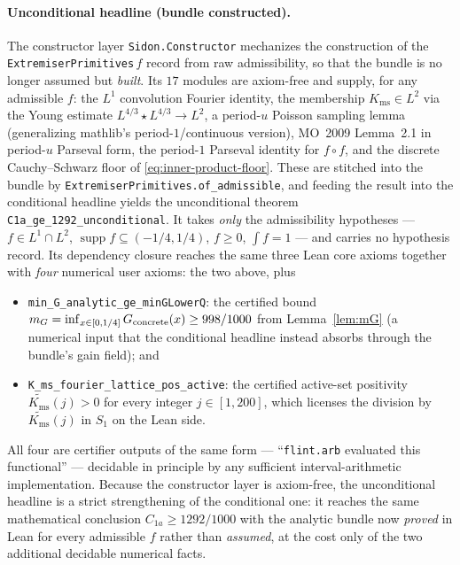 \documentclass[11pt, letterpaper]{article}
\theoremstyle{paperplain}
\theoremstyle{paperdef}
\newcommand{\supp}{\operatorname{supp}}
\newcommand{\Kms}{K_{\mathrm{ms}}}
\begin{document}
\paragraph{Unconditional headline (bundle constructed).}
The constructor layer \texttt{Sidon.Constructor} mechanizes the
construction of the \texttt{ExtremiserPrimitives}\,$f$ record from raw
admissibility, so that the bundle is no longer assumed but
\emph{built}.  Its $17$ modules are axiom-free and supply, for any
admissible $f$: the $L^1$ convolution Fourier identity, the
membership $\Kms\in L^2$ via the Young estimate
$L^{4/3}\!\star L^{4/3}\!\to L^2$, a period-$u$ Poisson sampling lemma
(generalizing mathlib's period-$1$/continuous version), MO~2009
Lemma~2.1 in period-$u$ Parseval form, the period-$1$ Parseval
identity for $f\circ f$, and the discrete Cauchy--Schwarz floor of
\eqref{eq:inner-product-floor}.  These are stitched into the bundle by
\texttt{ExtremiserPrimitives.of\_admissible}, and feeding the result
into the conditional headline yields the unconditional theorem
\texttt{C1a\_ge\_1292\_unconditional}.  It takes \emph{only} the
admissibility hypotheses --- $f\in L^1\cap L^2$, $\supp f\subseteq
(-1/4,1/4)$, $f\ge 0$, $\int f=1$ --- and carries no hypothesis record.
Its dependency closure reaches the same three Lean core axioms
together with \emph{four} numerical user axioms: the two above, plus
\begin{itemize}[leftmargin=2em]
\item \texttt{min\_G\_analytic\_ge\_minGLowerQ}: the certified bound
$m_G=\inf_{x\in[0,1/4]}G_{\rm concrete}(x)\ge 998/1000$ from
Lemma~\ref{lem:mG} (a numerical input that the conditional headline
instead absorbs through the bundle's gain field); and
\item \texttt{K\_ms\_fourier\_lattice\_pos\_active}: the certified
active-set positivity $\widetilde{\Kms}(j)>0$ for every integer
$j\in[1,200]$, which licenses the division by $\widetilde{\Kms}(j)$ in
$S_1$ on the Lean side.
\end{itemize}
All four are certifier outputs of the same form --- ``\texttt{flint.arb}
evaluated this functional'' --- decidable in principle by any
sufficient interval-arithmetic implementation.  Because the
constructor layer is axiom-free, the unconditional headline is a
strict strengthening of the conditional one: it reaches the same
mathematical conclusion $C_{1a}\ge 1292/1000$ with the analytic
bundle now \emph{proved} in Lean for every admissible $f$ rather than
\emph{assumed}, at the cost only of the two additional decidable
numerical facts.
\end{document}
